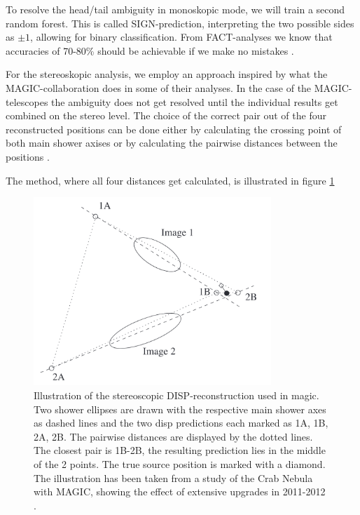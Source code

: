 To resolve the head/tail ambiguity in monoskopic mode,
we will train a second random forest.
This is called SIGN-prediction, interpreting the two possible sides
as $\pm1$, allowing for binary classification.
From FACT-analyses we know that accuracies of 70-80\% should be achievable
if we make no mistakes \cite{some fact paper}.

For the stereoskopic analysis, we employ an approach inspired by 
what the MAGIC-collaboration does in some of their analyses.
In the case of the MAGIC-telescopes the ambiguity does not
get resolved until the individual results get combined
on the stereo level. The choice of the correct
pair out of the four reconstructed positions can be done either
by calculating the crossing point of both main shower axises
or by calculating the pairwise distances between the positions \cite{ALEKSIC201676}.

The method, where all four distances get calculated, is illustrated in figure \ref{fig:disp_magic}

\begin{figure}
    \centering
    \includegraphics[width=0.8\textwidth]{images/magic_stereo_disp.png}
    \caption{Illustration of the stereoscopic DISP-reconstruction used in magic.
        Two shower ellipses are drawn with the respective main shower axes as dashed lines
        and the two disp predictions each marked as 1A, 1B, 2A, 2B.
        The pairwise distances are displayed by the dotted lines.
        The closest pair is 1B-2B, the resulting prediction lies in the middle of
        the 2 points. The true source position is marked with a diamond.
        The illustration has been taken from a study of the Crab Nebula with MAGIC,
        showing the effect of extensive upgrades in 2011-2012 \cite{ALEKSIC201676}.}
    \label{fig:disp_magic}
\end{figure}

